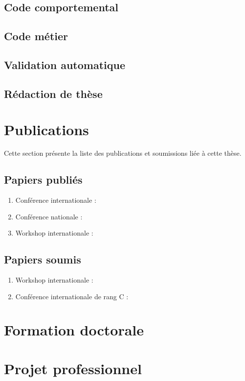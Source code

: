 \documentclass[a4paper]{article}
\begin{document}
\subsection{Code comportemental}
\label{sec:codeComportemental}

\subsection{Code métier}
\label{sec:codeMetier}

\subsection{Validation automatique}
\label{sec:validationAutomatique}

\subsection{Rédaction de thèse}
\label{sec:redaction}


\section{Publications}

Cette section présente la liste des publications et soumissions liée à cette thèse.

\subsection{Papiers publiés}

\begin{enumerate}
  \item Conférence internationale : 
  \item Conférence nationale : 
  \item Workshop internationale : 
\end{enumerate}

\subsection{Papiers soumis}

\begin{enumerate}
  \item Workshop internationale : 
  \item Conférence internationale de rang C : 
\end{enumerate}

\section{Formation doctorale}


\section{Projet professionnel}



\footnotesize{
  
  
}
\end{document}
